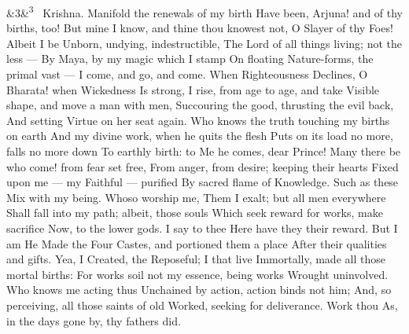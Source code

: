 \documentclass[12pt]{article}
\newcommand{\para}[1][]{\par\noindent\ifx&#1&\else\textsuperscript{\footnotesize #1}~\fi}
\begin{document}
\para[3] Krishna. Manifold the renewals of my birth Have been, Arjuna! and of thy births, too! But mine I know, and thine thou knowest not, O Slayer of thy Foes! Albeit I be Unborn, undying, indestructible, The Lord of all things living; not the less --- By Maya, by my magic which I stamp On floating Nature-forms, the primal vast --- I come, and go, and come. When Righteousness Declines, O Bharata! when Wickedness Is strong, I rise, from age to age, and take Visible shape, and move a man with men, Succouring the good, thrusting the evil back, And setting Virtue on her seat again. Who knows the truth touching my births on earth And my divine work, when he quits the flesh Puts on its load no more, falls no more down To earthly birth: to Me he comes, dear Prince! Many there be who come! from fear set free, From anger, from desire; keeping their hearts Fixed upon me --- my Faithful --- purified By sacred flame of Knowledge. Such as these Mix with my being. Whoso worship me, Them I exalt; but all men everywhere Shall fall into my path; albeit, those souls Which seek reward for works, make sacrifice Now, to the lower gods. I say to thee Here have they their reward. But I am He Made the Four Castes, and portioned them a place After their qualities and gifts. Yea, I Created, the Reposeful; I that live Immortally, made all those mortal births: For works soil not my essence, being works Wrought uninvolved. Who knows me acting thus Unchained by action, action binds not him; And, so perceiving, all those saints of old Worked, seeking for deliverance. Work thou As, in the days gone by, thy fathers did.
\end{document}

